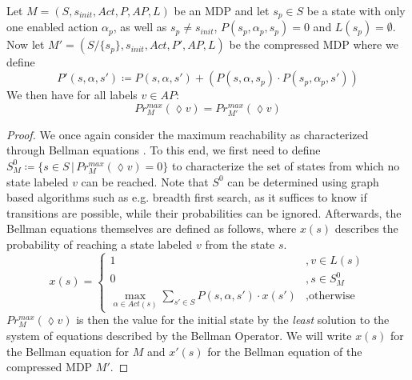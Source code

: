 \begin{theorem}\label{theo:compression}
	Let $M = (S, s_{init}, \mathit{Act}, P, \mathit{AP}, L)$ be an MDP and let $s_p \in S$ be a state with only one enabled action $\alpha_p$, as well as $s_p \neq s_{init}$, $P(s_p, \alpha_p, s_p) = 0$ and $L(s_p) = \emptyset$. 
	Now let $M' = (S/ \{s_p\}, s_{init}, \mathit{Act}, P', \mathit{AP}, L)$ be the compressed MDP where we define
	$$ P'(s, \alpha, s' ) \coloneqq P(s, \alpha, s') + \left(P(s, \alpha, s_p) \cdot P(s_p, \alpha_p, s')\right) $$
	We then have for all labels $v \in \mathit{AP}$:
	$$Pr^{max}_{M}(\lozenge v) = Pr^{max}_{M'}(\lozenge v)$$
\end{theorem}
\begin{proof}
	We once again consider the maximum reachability as characterized through Bellman equations \cite{forejt2011automated}. 
	To this end, we first need to define $S^0_M \coloneqq \{s \in S \,|\, Pr^{max}_M (\lozenge v) = 0\}$ to characterize the set of states from which no state labeled $v$ can be reached.
	Note that $S^0$ can be determined using graph based algorithms such as e.g. breadth first search, as it suffices to know if transitions are possible, while their probabilities can be ignored\cite{forejt2011automated}.
	Afterwards, the Bellman equations themselves are defined as follows, where $x(s)$ describes the probability of reaching a state labeled $v$ from the state $s$.
	$$ x(s) = \begin{cases}
		1 &, v \in L(s)\\
		0 &, s \in S^0_M\\
		\max\limits_{\alpha \in \mathit{Act(s)}} \sum\limits_{s' \in S} P(s, \alpha, s') \cdot x(s') &,\text{otherwise}
	\end{cases}$$
	$Pr^{max}_M (\lozenge v)$ is then the value for the initial state by the \textit{least} solution to the system of equations described by the Bellman Operator.
	We will write $x(s)$ for the Bellman equation for $M$ and $x'(s)$ for the Bellman equation of the compressed MDP $M'$.
	

\end{proof}

